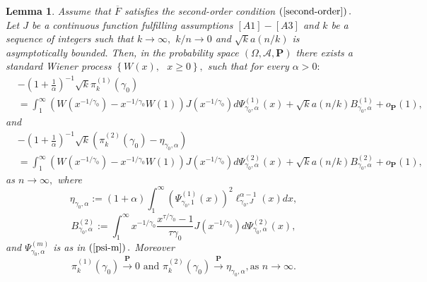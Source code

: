 \documentclass[12pt,reqno,openbib,runningheads,a4paper,portrait]{amsart}%
\newtheorem{lemma}{Lemma}[section]
\begin{document}
\begin{lemma}
\textbf{\label{lemma3}}Assume that $\overline{F}$ satisfies the second-order
condition $\left(  \ref{second-order}\right)  .$ Let $J$ be a continuous
function fulfilling assumptions $\left[  A1\right]  -\left[  A3\right]  $ and
$k$ be a sequence of integers such that $k\rightarrow\infty,$ $k/n\rightarrow0
$ and $\sqrt{k}a\left(  n/k\right)  $ is asymptotically bounded. Then, in the
probability space $\left(  \Omega,\mathcal{A},\mathbf{P}\right)  $ there
exists a standard Wiener process $\left\{  W\left(  x\right)  ,\text{ }%
x\geq0\right\}  ,$ such that for every $\alpha>0:$%
\begin{align}
&  -\left(  1+\frac{1}{\alpha}\right)  ^{-1}\sqrt{k}\pi_{k}^{\left(  1\right)
}\left(  \gamma_{0}\right) \nonumber\\
&  =\int_{1}^{\infty}\left(  W\left(  x^{-1/\gamma_{0}}\right)  -x^{-1/\gamma
_{0}}W\left(  1\right)  \right)  J\left(  x^{-1/\gamma_{0}}\right)
d\Psi_{\gamma_{0},\alpha}^{\left(  1\right)  }\left(  x\right)  +\sqrt
{k}a\left(  n/k\right)  B_{\gamma_{0},\alpha}^{\left(  1\right)
}+o_{\mathbf{P}}\left(  1\right)  , \label{app1}%
\end{align}
and%
\begin{align}
&  -\left(  1+\frac{1}{\alpha}\right)  ^{-1}\sqrt{k}\left(  \pi_{k}^{\left(
2\right)  }\left(  \gamma_{0}\right)  -\eta_{\gamma_{0},\alpha}\right)
\label{app2}\\
&  =\int_{1}^{\infty}\left(  W\left(  x^{-1/\gamma_{0}}\right)  -x^{-1/\gamma
_{0}}W\left(  1\right)  \right)  J\left(  x^{-1/\gamma_{0}}\right)
d\Psi_{\gamma_{0},\alpha}^{\left(  2\right)  }\left(  x\right)  +\sqrt
{k}a\left(  n/k\right)  B_{\gamma_{0},\alpha}^{\left(  2\right)
}+o_{\mathbf{P}}\left(  1\right)  ,\nonumber
\end{align}
as $n\rightarrow\infty,$ where
\begin{equation}
\eta_{\gamma_{0},\alpha}:=\left(  1+\alpha\right)  \int_{1}^{\infty}\left(
\Psi_{\gamma_{0},1}^{\left(  1\right)  }\left(  x\right)  \right)  ^{2}%
\ell_{\gamma_{0},J}^{\alpha-1}\left(  x\right)  dx, \label{eta}%
\end{equation}%
\begin{equation}
B_{\gamma_{0},\alpha}^{\left(  2\right)  }:=\int_{1}^{\infty}x^{-1/\gamma_{0}%
}\frac{x^{\tau/\gamma_{0}}-1}{\tau\gamma_{0}}J\left(  x^{-1/\gamma_{0}%
}\right)  d\Psi_{\gamma_{0},\alpha}^{\left(  2\right)  }\left(  x\right)  ,
\label{AB}%
\end{equation}
and $\Psi_{\gamma_{0},\alpha}^{\left(  m\right)  }$ is as in $\left(
\ref{psi-m}\right)  .$ Moreover
\begin{equation}
\pi_{k}^{\left(  1\right)  }\left(  \gamma_{0}\right)  \overset{\mathbf{P}%
}{\rightarrow}0\text{ and }\pi_{k}^{\left(  2\right)  }\left(  \gamma
_{0}\right)  \overset{\mathbf{P}}{\rightarrow}\eta_{\gamma_{0},\alpha},\text{
as }n\rightarrow\infty. \label{consist}%
\end{equation}

\end{lemma}
\end{document}

